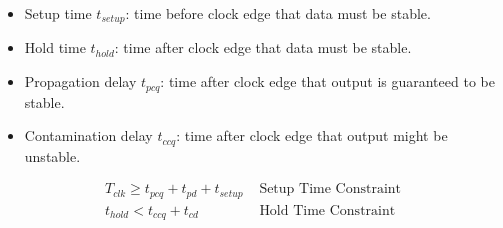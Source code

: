 \documentclass[8pt]{article}
\begin{document}
\begin{itemize}
  \item Setup time $t_{setup}$: time before clock edge that data must be
        stable.
  \item Hold time $t_{hold}$: time after clock edge that data must be stable.
  \item Propagation delay $t_{pcq}$: time after clock edge that output
        is guaranteed to be stable.
  \item Contamination delay $t_{ccq}$: time after clock edge that output
        might be unstable.
\end{itemize}

\begin{align}
  T_{clk} \geq t_{pcq} + t_{pd} + t_{setup} & \text{ Setup Time Constraint} \\
  t_{hold} < t_{ccq} + t_{cd}               & \text{ Hold Time Constraint}
\end{align}
\end{document}
